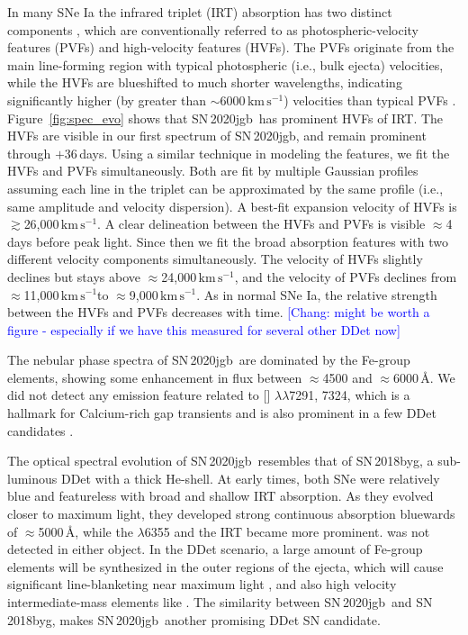 \documentclass[twocolumn]{aastex631}
\newcommand{\sn}{SN\,2020jgb}
\newcommand{\kms}{$\mathrm{km}\,\mathrm{s}^{-1}$}
\newcommand{\chang}[1]{\textcolor{blue}{[Chang: #1]}}
\begin{document}
In many SNe Ia the  infrared triplet (IRT) absorption has two distinct components \citep{Mazzali_2005}, which are conventionally referred to as photospheric-velocity features (PVFs) and high-velocity features (HVFs). The PVFs originate from the main line-forming region with typical photospheric (i.e., bulk ejecta) velocities, while the HVFs are blueshifted to much shorter wavelengths, indicating significantly higher (by greater than $\sim$6000\,\kms) velocities than typical PVFs \citep{Silverman_HVF_2015}. Figure~\ref{fig:spec_evo} shows that \sn\ has prominent HVFs of  IRT. The HVFs are visible in our first spectrum of \sn, and remain prominent through $+36$\,days. Using a similar technique in modeling the  features, we fit the HVFs and PVFs simultaneously. Both are fit by multiple Gaussian profiles assuming each line in the triplet can be approximated by the same profile (i.e., same amplitude and velocity dispersion). A best-fit expansion velocity of HVFs is $\gtrsim$26,000\,\kms. A clear delineation between the HVFs and PVFs is visible $\approx$4\,days before peak light. Since then we fit the broad absorption features with two different velocity components simultaneously. The velocity of HVFs slightly declines but stays above $\approx$24,000\,\kms, and the velocity of PVFs declines from $\approx$11,000\,\kms to $\approx$9,000\,\kms. As in normal SNe Ia, the relative strength between the HVFs and PVFs decreases with time. \chang{might be worth a figure - especially if we have this measured for several other DDet now}

The nebular phase spectra of \sn\ are dominated by the Fe-group elements, showing some enhancement in flux between $\approx$4500 and $\approx$6000\,\AA. We did not detect any emission feature related to [] $\lambda\lambda$7291, 7324, which is a hallmark for Calcium-rich gap transients and is also prominent in a few DDet candidates \citep[e.g., SN\,2016hnk and SN\,2019ofm;][]{De_Ca-rich_2020}. 

The optical spectral evolution of \sn\ resembles that of SN\,2018byg, a sub-luminous DDet with a thick He-shell. At early times, both SNe were relatively blue and featureless with broad and shallow  IRT absorption. As they evolved closer to maximum light, they developed strong continuous absorption bluewards of $\approx$5000\,\AA, while the  $\lambda$6355 and the  IRT became more prominent.  was not detected in either object. In the DDet scenario, a large amount of Fe-group elements will be synthesized in the outer regions of the ejecta, which will cause significant line-blanketing near maximum light \citep{Kromer_DD_2010, polin_observational_2019}, and also high velocity intermediate-mass elements like  \citep{Fink_DD_2010, Kromer_DD_2010,Shen_DD_2014}. The similarity between \sn\ and SN\,2018byg, makes \sn\ another promising DDet SN candidate. 
\end{document}
